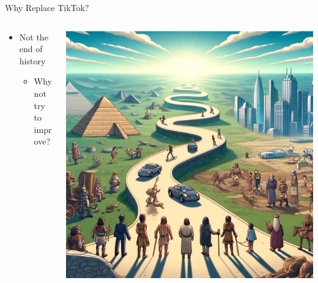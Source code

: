 \documentclass[aspectratio=169]{beamer}
\begin{document}
\begin{frame}{Why Replace TikTok?}
\begin{columns}[T]
    \begin{column}[T]{0.5\textwidth}
        \vspace{0.5in}
        \begin{itemize}
            \item Not the end of history
            \begin{itemize}
                \item Why not try to improve?
            \end{itemize}
        \end{itemize}
    \end{column}
    \begin{column}{0.5\textwidth}
        \includegraphics[height=0.8\textheight]{imgs/why_replace/future_path.jpeg}
    \end{column}
\end{columns}
\end{frame}
\end{document}
